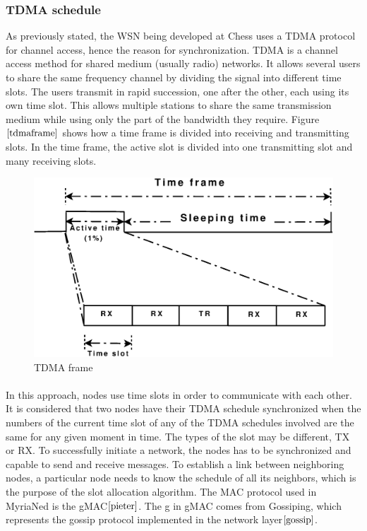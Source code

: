 \documentclass[a4paper,10pt]{report}
\begin{document}
\subsubsection{TDMA schedule}
As previously stated, the WSN being developed at Chess uses a TDMA protocol for channel access, hence the reason for synchronization.
TDMA is a channel access method for shared medium (usually radio) networks. It allows several users to share the same frequency
channel by dividing the signal into different time slots. The users transmit in rapid succession, one after the other, each using its
own time slot. This allows multiple stations to share the same transmission medium while using only the part of the bandwidth they
require. Figure $\ref{tdmaframe}$ shows how a time frame is divided into receiving and transmitting slots. In the time frame, the active
slot is divided into one transmitting slot and many receiving slots.
\begin{figure}
\centering
\includegraphics[width=0.6 \textwidth]{tdmaframe}
\caption{TDMA frame} \label{tdmaframe}
\end{figure}
\paragraph*{} In this approach, nodes use time slots in order to communicate with each other. It is considered that two nodes have
their TDMA schedule synchronized when the numbers of the current time slot of any of the TDMA schedules involved are the same for any
given moment in time. The types of the slot may be different, TX or RX. To successfully initiate a network, the nodes has to be
synchronized and capable to send and receive messages. To establish a link between neighboring nodes, a particular node needs to know
the schedule of all its neighbors, which is the purpose of the slot allocation algorithm. The MAC protocol used in MyriaNed is the gMAC$\cite{pieter}$. The g in gMAC comes from Gossiping, which represents the gossip protocol implemented in the network layer$\cite{gossip}$.
\end{document}
